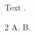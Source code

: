 \documentclass{article}
\begin{document}
Text \citep{a,b}.
\begin{thebibliography}{2}
 A.
 B.
\end{thebibliography}
\end{document}
